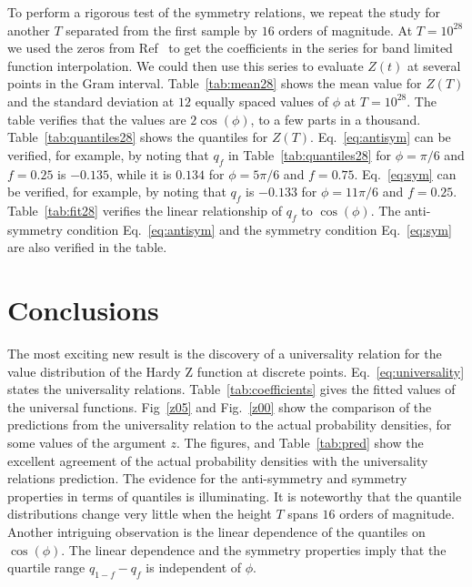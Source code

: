 \documentclass[twoside]{article}
\begin{document}
To perform a rigorous test of the symmetry relations, we repeat the study for another $T$ separated from the first sample by $16$ orders of magnitude. At $T=10^{28}$ we used the  zeros from Ref~\cite{hiary 2010} to get the coefficients in the series for band limited function interpolation. We could then use this series to evaluate  $Z(t)$  at several points in the Gram interval.
Table~\ref{tab:mean28} shows the mean value for $Z(T)$  and the standard deviation at $12$ equally spaced values of $\phi$ at $T=10^{28}$. The table verifies that the values are $2\cos(\phi)$, to a few parts in a thousand. Table~\ref{tab:quantiles28} shows the quantiles for $Z(T)$.  Eq.~\ref{eq:antisym} can be verified, for example, by noting that $q_f$ in Table~\ref{tab:quantiles28}
for $\phi=\pi/6$ and $f=0.25$ is $-0.135$, while it is $0.134$ for $\phi=5\pi/6$ and $f=0.75$. Eq.~\ref{eq:sym} can be verified, for example, by noting that $q_f$ is $-0.133$ for $\phi=11\pi/6$ and $f=0.25$. Table~\ref{tab:fit28} verifies the linear relationship of $q_f$ to $\cos(\phi)$. The anti-symmetry condition Eq.~\ref{eq:antisym}  and the symmetry condition Eq.~\ref{eq:sym} are also verified in the table.


\section{\label{conclusions}Conclusions}

The most exciting new result is the discovery of a universality relation for the 
value distribution of the Hardy Z function at discrete points. Eq.~\ref{eq:universality}
states the universality relations. Table~\ref{tab:coefficients} gives the fitted values 
of the universal functions.
Fig~\ref{z05} and Fig.~\ref{z00} show the comparison of the predictions from the universality 
relation to the actual probability densities, for some values of the argument $z$. The figures, and 
Table~\ref{tab:pred} show the excellent agreement of the actual probability densities with the
universality relations prediction.
The evidence for the anti-symmetry and symmetry properties 
in terms of quantiles is illuminating. 
It is noteworthy that the quantile distributions change very little 
when the height $T$ spans $16$ orders of magnitude. 
Another intriguing observation is the linear dependence of the quantiles 
on $\cos(\phi)$. The linear dependence and the symmetry properties imply that 
the quartile range $q_{1-f}-q_f$ is independent of $\phi$.
\end{document}
